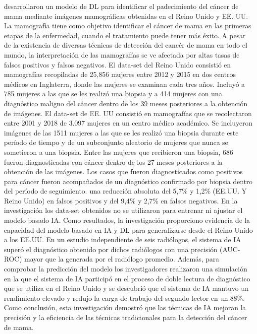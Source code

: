 \citep{McKinney2020} desarrollaron un modelo de DL para identificar el padecimiento del cáncer de mama mediante imágenes mamográficas obtenidas en el Reino Unido y EE. UU. La mamografía tiene como objetivo identificar el cáncer de mama en las primeras etapas de la enfermedad, cuando el tratamiento puede tener más éxito. A pesar de la existencia de diversas técnicas de detección del cancér de mama en todo el mundo, la interpretación de las mamografías se ve afectada por altas tasas de falsos positivos y falsos negativos. El data-set del Reino Unido consistió en mamografías recopiladas de 25,856 mujeres entre 2012 y 2015 en dos centros médicos en Inglaterra, donde las mujeres se examinan cada tres años. Incluyó a 785 mujeres a las que se les realizó una biopsia y a 414 mujeres con una diagnóstico maligno del cáncer dentro de los 39 meses posteriores a la obtención de imágenes. El data-set de EE. UU consistió en mamografías que se recolectaron entre 2001 y 2018 de 3.097 mujeres en un centro médico académico. Se incluyeron imágenes de las 1511 mujeres a las que se les realizó una biopsia durante este período de tiempo y de un subconjunto aleatorio de mujeres que nunca se sometieron a una biopsia. Entre las mujeres que recibieron una biopsia, 686 fueron diagnosticadas con cáncer dentro de los 27 meses posteriores a la obtención de las imágenes. Los casos que fueron diagnosticados como positivos para cáncer fueron acompañados de un diagnóstico confirmado por biopsia dentro del período de seguimiento. una reducción absoluta del 5,7\% y 1,2\% (EE.UU. Y Reino Unido) en falsos positivos y del 9,4\% y 2,7\% en falsos negativos. En la investigación los data-set obtenidos no se utilizaron para entrenar ni ajustar el modelo basado IA. Como resultados, la investigación proporciono evidencia de la capacidad del modelo basado en IA y DL para generalizarse desde el Reino Unido a los EE.UU. En un estudio independiente de seis radiólogos, el sistema de IA superó el diagnóstico obtenido por dichos radiólogos con una precisión (AUC-ROC) mayor que la generada por el radiólogo promedio. Además, para comprobar la predicción del modelo los investigadores realizaron una simulación en la que el sistema de IA participó en el proceso de doble lectura de diagnóstico que se utiliza en el Reino Unido y se descubrió que el sistema de IA mantuvo un rendimiento elevado y redujo la carga de trabajo del segundo lector en un 88\%. Como conclusión, esta investigación demostró que las técnicas de IA mejoran la precisión y la eficiencia de las técnicas tradicionales para la detección del cáncer de mama.


